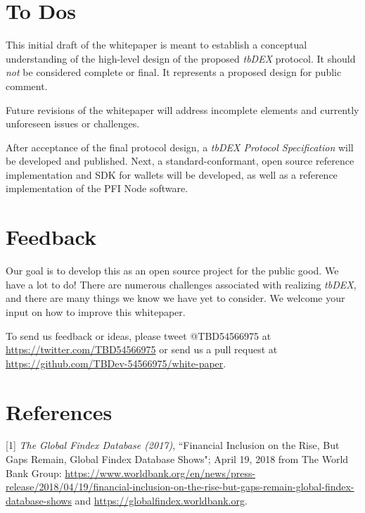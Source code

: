 \documentclass[11pt]{article}
\begin{document}
\vspace{1\baselineskip}
\section{To Dos}

\vspace{1\baselineskip}
This initial draft of the whitepaper is meant to establish a conceptual understanding of the high-level design of the proposed \textit{tbDEX} protocol. It should \textit{not} be considered complete or final. It represents a proposed design for public comment.  

\vspace{1\baselineskip}
Future revisions of the whitepaper will address incomplete elements and currently unforeseen issues or challenges. 

\vspace{1\baselineskip}
After acceptance of the final protocol design, a \textit{tbDEX Protocol Specification }will be developed and published. Next, a standard-conformant, open source reference implementation and SDK for wallets will be developed, as well as a reference implementation of the PFI Node software. 

\vspace{1\baselineskip}
\section{Feedback}

\vspace{1\baselineskip}
Our goal is to develop this as an open source project for the public good. We have a lot to do! There are numerous challenges associated with realizing \textit{tbDEX}, and there are many things we know we have yet to consider. We welcome your input on how to improve this whitepaper. 

\vspace{1\baselineskip}
To send us feedback or ideas, please tweet @TBD54566975 at \url{https://twitter.com/TBD54566975} or send us a pull request at \url{https://github.com/TBDev-54566975/white-paper}{\Large .}

\vspace{1\baselineskip}
\section{References}

[1] \textit{The Global Findex Database (2017)}, ``Financial Inclusion on the Rise, But Gaps Remain, Global Findex Database Shows"; April 19, 2018 from The World Bank Group: \url{https://www.worldbank.org/en/news/press-release/2018/04/19/financial-inclusion-on-the-rise-but-gaps-remain-global-findex-database-shows} and \url{https://globalfindex.worldbank.org}. 
\end{document}
